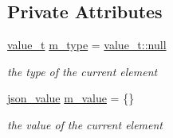 \subsection*{Private Attributes}
\begin{DoxyCompactItemize}
\item 
\hyperlink{classnlohmann_1_1basic__json_a231b02148577b69a154b2ce2c87a5522}{value\+\_\+t} \hyperlink{classnlohmann_1_1basic__json_a7a1d275f5420bca10dff52a774d9a950}{m\+\_\+type} = \hyperlink{classnlohmann_1_1basic__json_a231b02148577b69a154b2ce2c87a5522a37a6259cc0c1dae299a7866489dff0bd}{value\+\_\+t\+::null}
\begin{DoxyCompactList}\small\item\em the type of the current element \end{DoxyCompactList}\item 
\hyperlink{unionnlohmann_1_1basic__json_1_1json__value}{json\+\_\+value} \hyperlink{classnlohmann_1_1basic__json_a7d014eac0fb6ffaeceee0171ffa0df45}{m\+\_\+value} = \{\}
\begin{DoxyCompactList}\small\item\em the value of the current element \end{DoxyCompactList}\end{DoxyCompactItemize}
